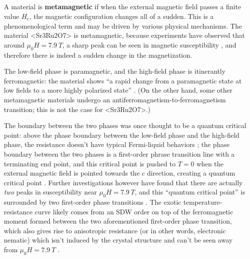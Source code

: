 \documentclass[hyperref, a4paper]{article}
\newcommand*{\concept}[1]{{\textbf{#1}}}
\def\ce#1{<#1>}%
\begin{document}
\subsection{}

A material is \concept{metamagnetic} if 
when the external magnetic field passes a finite value $H_{\text{c}}$,
the magnetic configuration changes all of a sudden.
This is a phenomenological term 
and may be driven by various physical mechanisms.
The material \ce{Sr3Ru2O7} is metamagnetic, 
because experiments have observed that 
around $\mu_0 H = \SI{7.9}{T}$, 
a sharp peak can be seen in magnetic susceptibility
\cite{grigera2004disorder},
and therefore there is indeed a sudden change in the magnetization.

The low-field phase is paramagnetic, 
and the high-field phase is itinerantly ferromagnetic:
the material shows 
``a rapid change from a paramagnetic state at low fields to
a more highly polarized state'' \cite{perry2001metamagnetism}.
(On the other hand, some other metamagnetic materials 
undergo an antiferromagnetism-to-ferromagnetism transition;
this is not the case for \ce{Sr3Ru2O7}.)

The boundary between the two phases was once thought to be a quantum critical point:
above the phase boundary between the low-field phase and the high-field phase,
the resistance doesn't have typical Fermi-liquid behaviors
\cite{perry2001metamagnetism};
the phase boundary between the two phases 
is a first-order phrase transition line with a terminating end point, 
and this critical point is pushed to $T = 0$
when the external magnetic field is pointed towards the $c$ direction,
creating a quantum critical point \cite{grigera2003angular}.
Further investigations however have found 
that there are actually \emph{two} peaks in susceptibility 
near $\mu_0 H =\SI{7.9}{T}$, 
and this ``quantum critical point'' is surrounded by two first-order phase transitions
\cite{kitagawa2005metamagnetic,grigera2004disorder}.
The exotic temperature-resistance curve likely comes from 
an SDW order on top of the ferromagnetic moment
formed between the two aforementioned first-order phase transition,
which also gives rise to anisotropic resistance
(or in other words, electronic nematic)
which isn't induced by the crystal structure
and can't be seen away from $\mu_0 H =\SI{7.9}{T}$
\cite{lester2015field,borzi2007formation}.

\subsection{}
\end{document}

